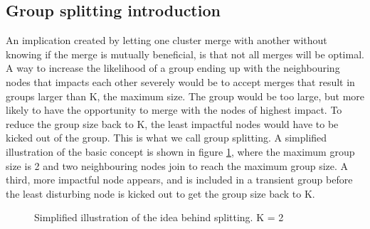 \subsection{Group splitting introduction}
An implication created by letting one cluster merge with another without knowing if the merge is mutually beneficial, is that not all merges will be optimal.
A way to increase the likelihood of a group ending up with the neighbouring nodes that impacts each other severely would be to accept merges that result in groups larger than K, the maximum size. 
The group would be too large, but more likely to have the opportunity to merge with the nodes of highest impact. To reduce the group size back to K,
the least impactful nodes would have to be kicked out of the group. This is what we call group splitting. A simplified illustration of the basic concept is shown in figure \ref{fig:splitting},
where the maximum group size is 2 and two neighbouring nodes join to reach the maximum group size. A third, more impactful node appears, and is included in a transient group
before the least disturbing node is kicked out to get the group size back to K. 

\begin{figure}
	\centering
		\qquad
		\qquad

		\qquad
		\qquad
		\caption{Simplified illustration of the idea behind splitting. K = 2}%
		\label{fig:splitting}%
\end{figure}

